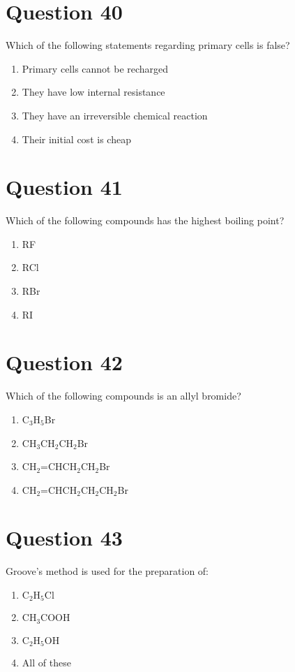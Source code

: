 \documentclass{article}
\begin{document}
\section*{Question 40}
Which of the following statements regarding primary cells is false?
\begin{enumerate}[label=(\alph*)]
\item Primary cells cannot be recharged
\item They have low internal resistance
\item They have an irreversible chemical reaction
\item Their initial cost is cheap
\end{enumerate}
\newpage
\section*{Question 41}
Which of the following compounds  has the highest boiling point?
\begin{enumerate}[label=(\alph*)]
\item RF
\item RCl
\item RBr
\item RI
\end{enumerate}
\newpage
\section*{Question 42}
Which of the following compounds is an allyl bromide?
\begin{enumerate}[label=(\alph*)]
\item C$_{3}$H$_{5}$Br\newline
\item CH$_{3}$CH$_{2}$CH$_{2}$Br
\item CH$_{2}$=CHCH$_{2}$CH$_{2}$Br
\item CH$_{2}$=CHCH$_{2}$CH$_{2}$CH$_{2}$Br
\end{enumerate}
\newpage
\section*{Question 43}
Groove's method is used for the preparation of:\newline
\begin{enumerate}[label=(\alph*)]
\item \(\mathrm{C}_2 \mathrm{H}_5 \mathrm{Cl}\)\newline
\item \(\mathrm{CH}_3 \mathrm{COOH}\)\newline
\item \(\mathrm{C}_2 \mathrm{H}_5 \mathrm{OH}\)\newline
\item All of these\newline
\end{enumerate}
\newpage
\end{document}
